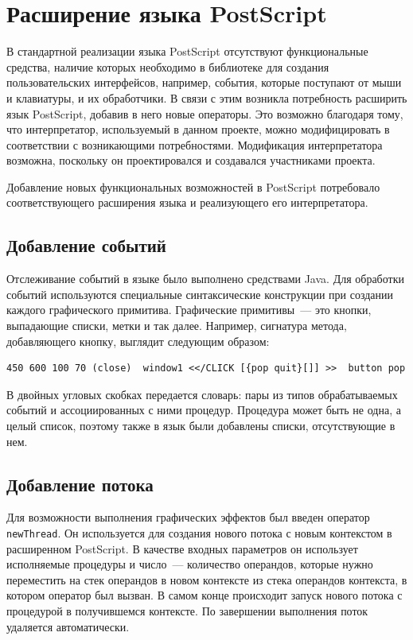 

\section{Расширение языка PostScript}
В стандартной реализации языка PostScript отсутствуют функциональные средства, наличие которых необходимо в библиотеке для создания пользовательских интерфейсов, например, события, которые поступают от мыши и клавиатуры, и их обработчики. В связи с этим возникла потребность расширить язык PostScript, добавив в него новые операторы. Это возможно благодаря тому, что интерпретатор, используемый в данном проекте, можно модифицировать в соответствии с возникающими потребностями. Модификация интерпретатора возможна, поскольку он проектировался и создавался  участниками проекта.

Добавление новых функциональных возможностей в PostScript потребовало соответствующего расширения языка и реализующего его интерпретатора. 

\subsection{Добавление событий}
Отслеживание событий в языке было выполнено средствами Java. Для обработки событий используются специальные синтаксические конструкции при создании каждого графического примитива. Графические примитивы~--- это кнопки, выпадающие списки, метки и так далее. Например, сигнатура метода, добавляющего кнопку, выглядит следующим образом:

\lstset{language=PostScript,basicstyle=\footnotesize\ttfamily} 
\begin{lstlisting}
450 600 100 70 (close)  window1 <</CLICK [{pop quit}[]] >>  button pop
\end{lstlisting}

В двойных угловых скобках передается словарь: пары из типов обрабатываемых событий и ассоциированных с ними процедур. Процедура может быть не одна, а целый список, поэтому также в язык были добавлены списки, отсутствующие в нем.

\subsection{Добавление потока}
 Для возможности выполнения графических эффектов был введен оператор \texttt{newThread}. Он используется для создания нового потока с новым контекстом в расширенном PostScript. В качестве входных параметров он использует исполняемые процедуры и число~--- количество операндов, которые нужно переместить на стек операндов в новом контексте из стека операндов контекста, в котором оператор был вызван. В самом конце происходит запуск нового потока с процедурой в получившемся контексте. По завершении выполнения поток удаляется автоматически.
 
